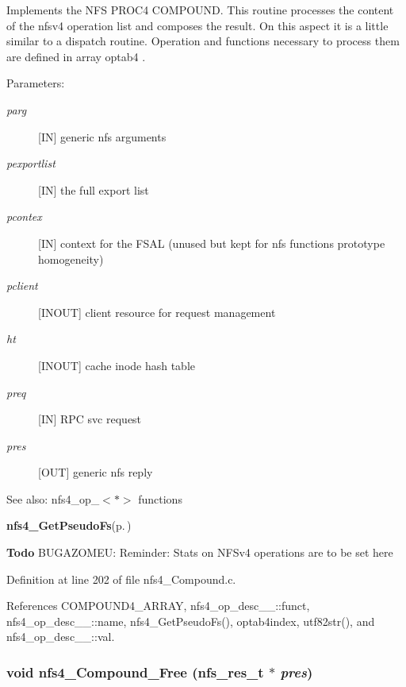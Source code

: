 Implements the NFS PROC4 COMPOUND. This routine processes the content of the nfsv4 operation list and composes the result. On this aspect it is a little similar to a dispatch routine. Operation and functions necessary to process them are defined in array optab4 .

\begin{Desc}
\item[Parameters:]
\begin{description}
\item[{\em parg}][IN] generic nfs arguments \item[{\em pexportlist}][IN] the full export list \item[{\em pcontex}][IN] context for the FSAL (unused but kept for nfs functions prototype homogeneity) \item[{\em pclient}][INOUT] client resource for request management \item[{\em ht}][INOUT] cache inode hash table \item[{\em preq}][IN] RPC svc request \item[{\em pres}][OUT] generic nfs reply\end{description}
\end{Desc}
\begin{Desc}
\item[See also:]nfs4\_\-op\_\-$<$$\ast$$>$ functions 

{\bf nfs4\_\-Get\-Pseudo\-Fs}{\rm (p.\,\pageref{nfs4__pseudo_8c_a16})}\end{Desc}


\begin{Desc}
\item[{\bf Todo}]BUGAZOMEU: Reminder: Stats on NFSv4 operations are to be set here\end{Desc}


Definition at line 202 of file nfs4\_\-Compound.c.

References COMPOUND4\_\-ARRAY, nfs4\_\-op\_\-desc\_\-\_\-::funct, nfs4\_\-op\_\-desc\_\-\_\-::name, nfs4\_\-Get\-Pseudo\-Fs(), optab4index, utf82str(), and nfs4\_\-op\_\-desc\_\-\_\-::val.
\subsubsection{\setlength{\rightskip}{0pt plus 5cm}void nfs4\_\-Compound\_\-Free (nfs\_\-res\_\-t $\ast$ {\em pres})}\label{nfs4__Compound_8c_a5}


